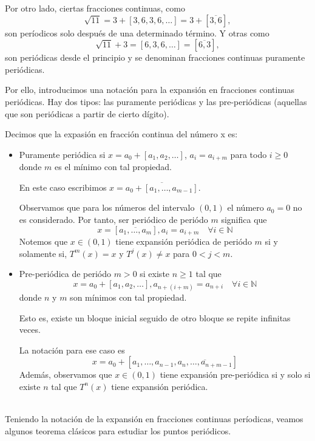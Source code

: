 \documentclass[12pt]{report}
\begin{document}
Por otro lado, ciertas fracciones continuas, como
$$
\sqrt{11} = 3+[3,6,3,6,\ldots] = 3+[\overline{3,6}],
$$
son períodicos solo después de una determinado término. Y otras como
$$
\sqrt{11} +3 = [6,3,6,\ldots] = [\overline{6,3}],
$$
son periódicas desde el principio y se denominan fracciones continuas puramente periódicas.

Por ello, introducimos una notación para la expansión en fracciones continuas periódicas. Hay dos tipos: las puramente periódicas y las pre-periódicas (aquellas que son periódicas a partir de cierto dígito).

Decimos que la expasión en fracción continua del número x es:
\begin{itemize}
    \item Puramente periódica si $x=a_{0}+[a_{1},a_{2},\ldots]$, $a_{i}=a_{i+m}$ para todo $i\geq0$ donde $m$ es el mínimo con tal propiedad.
    
    En este caso escribimos $x=\overline{a_{0}+[a_{1},\ldots,a_{m-1}]}$.
    
    Observamos que para los números del intervalo $(0,1)$ el número $a_{0}=0$ no es considerado. Por tanto, ser periódico de periódo $m$ significa que
    $$
    x=[\overline{a_{1},\ldots,a_{m}}], a_{i}=a_{i+m}\quad\forall i\in\mathbb{N}
    $$
    Notemos que $x\in(0,1)$ tiene expansión periódica de periódo $m$ si y solamente si, $T^{m}(x)=x$ y $T^{j}(x)\neq x$ para $0<j<m$.
    \item Pre-periódica de periódo $m>0$ si existe $n\geq1$ tal que
    $$
    x=a_{0}+[a_{1},a_{2},\ldots], a_{n+(i+m)}=a_{n+i}\quad\forall i\in\mathbb{N}
    $$
    donde $n$ y $m$ son mínimos con tal propiedad.
    
    Esto es, existe un bloque inicial seguido de otro bloque se repite infinitas veces.
    
    La notación para ese caso es
    $$
    x=a_{0}+[a_{1},\ldots,a_{n-1},\overline{a_{n},\ldots,a_{n+m-1}}]
    $$
    Además, observamos que $x\in(0,1)$ tiene expansión pre-periódica si y solo si existe $n$ tal que $T^{n}(x)$ tiene expansión periódica.
\end{itemize}
\\
Teniendo la notación de la expansión en fracciones continuas períodicas, veamos algunos teorema clásicos para estudiar los puntos periódicos.
\end{document}
